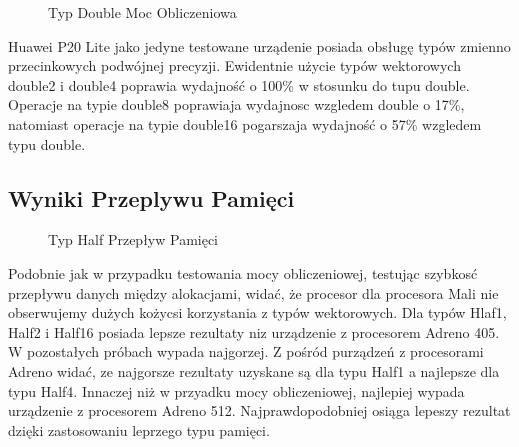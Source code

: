 \begin{figure}[H]
\caption{Typ Double Moc Obliczeniowa}
\end{figure}

Huawei P20 Lite jako jedyne testowane urządenie posiada obsługę typów zmienno przecinkowych podwójnej precyzji. Ewidentnie użycie typów wektorowych double2 i double4 poprawia wydajność o 100\% w stosunku do tupu double. Operacje na typie double8 poprawiaja wydajnosc wzgledem double o 17\%, natomiast operacje na typie double16 pogarszaja wydajność o 57\% wzgledem typu double.

\subsection[Wyniki Przeplywu Pamięci]{Wyniki Przeplywu Pamięci}

\begin{figure}[H]
\caption{Typ Half Przepływ Pamięci}
\end{figure}
Podobnie jak w przypadku testowania mocy obliczeniowej, testując szybkosć przepływu danych między alokacjami, widać, że procesor dla procesora Mali nie obserwujemy dużych kożycsi korzystania z typów wektorowych. Dla typów Hlaf1, Half2 i Half16 posiada lepsze rezultaty niz urządzenie z procesorem Adreno 405. W pozostałych próbach wypada najgorzej. Z pośród purządzeń z procesorami Adreno widać, ze najgorsze rezultaty uzyskane są dla typu Half1 a najlepsze dla typu Half4. Innaczej niż w przyadku mocy obliczeniowej, najlepiej wypada urządzenie z procesorem Adreno 512. Najprawdopodobniej osiąga lepeszy rezultat dzięki zastosowaniu leprzego typu pamięci.

